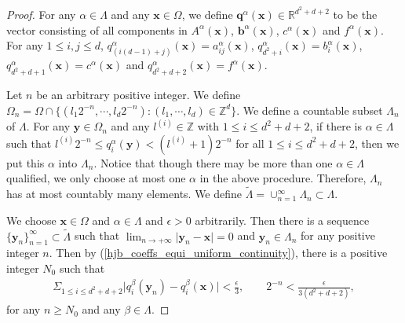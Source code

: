 \documentclass[12pt]{amsart}
\newcommand{\boldx}{\boldsymbol{x}}
\newcommand{\boldy}{\boldsymbol{y}}
\theoremstyle{definition}
\theoremstyle{remark}
\begin{document}
\begin{proof}
For any $\alpha \in \Lambda$ and any $\boldx \in \Omega$, we define $\boldsymbol{q}^{\alpha}(\boldx)\in \mathbb{R}^{d^{2}+d+2}$ 
to be the vector consisting of all components in $A^{\alpha}(\boldx)$, $\boldsymbol{b}^{\alpha}(\boldx)$, 
$c^{\alpha}(\boldx)$ and $f^{\alpha}(\boldx)$.  For any $1\leq i,j \leq d$, $q_{(i(d-1)+j)}^{\alpha}(\boldx) 
= a_{ij}^{\alpha}(\boldx)$, $q_{d^{2}+i}^{\alpha}(\boldx) = b_{i}^{\alpha}(\boldx)$, $q_{d^{2}+d+1}^{\alpha}(\boldx) 
= c^{\alpha}( \boldx )$ and $q_{d^{2}+d+2}^{\alpha}(\boldx) = f^{\alpha}(\boldx)$. 

Let $n$ be an arbitrary positive integer. We define $\Omega_{n} = \Omega \cap 
\{(l_{1}2^{-n},\cdots, l_{d}2^{-n}): (l_{1},\cdots,l_{d})\in \mathbb{Z}^{d}\}$.
We define a countable subset $\Lambda_{n}$ of $\Lambda$. 
For any $\boldy \in \Omega_{n}$ and any $l^{(i)} \in \mathbb{Z}$ with $1 \leq i \leq d^{2}+d+2$, if there 
is $\alpha \in \Lambda$ 
such that $l^{(i)}2^{-n}\leq q_{i}^{\alpha}(\boldy) < (l^{(i)}+1)2^{-n}$ for all $1 \leq i \leq d^{2}+d+2$, then 
we put this $\alpha$ into $\Lambda_{n}$.
Notice that though there may be more than one $\alpha \in \Lambda$ qualified, we only choose 
at most one $\alpha$ in the above procedure. Therefore, $\Lambda_{n}$ has at most countably many 
elements. We define $\tilde{\Lambda} = \cup_{n=1}^{\infty}\Lambda_{n} \subset \Lambda$. 

We choose $\boldx \in \Omega$ and $\alpha \in \Lambda$ and $\epsilon >0$ arbitrarily. 
Then there is a sequence $\{\boldy_{n}\}_{n=1}^{\infty} \subset \tilde{\Lambda}$ such that 
$ \lim_{n \rightarrow +\infty}\vert \boldy_{n} - \boldx \vert = 0$ and $\boldy_{n}\in \Lambda_{n}$ 
for any positive integer $n$. Then by (\ref{hjb_coeffs_equi_uniform_continuity}), there is a positive 
integer $N_{0}$ such that 
\begin{align*}
\Sigma_{1 \leq i \leq d^{2}+d+2} \vert q_{i}^{\beta}(\boldy_{n}) - q_{i}^{\beta}(\boldx) \vert < \frac{\epsilon}{3}, 
\qquad 2^{-n} < \frac{\epsilon}{3 (d^{2} + d + 2) },
\end{align*}
for any $n \geq N_{0}$ and any $\beta \in \Lambda$. 


\end{proof}
\end{document}
